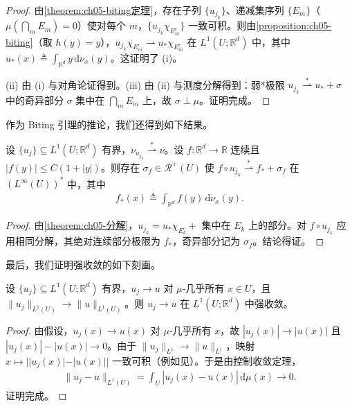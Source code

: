 \documentclass[../../main.tex]{subfiles}%
\begin{document}
\begin{proof}
由\cref{theorem:ch05-biting定理}，存在子列 $\{u_{j_k}\}$、递减集序列 $\{E_m\}$（$\mu(\bigcap_m E_m)=0$）使对每个 $m$，$\{u_{j_k}\chi_{E_m^c}\}$ 一致可积。则由\cref{proposition:ch05-biting}（取 $h(y)=y$），$u_{j_k}\chi_{E_m^c}\rightharpoonup u_*\chi_{E_m^c}$ 在 $L^1(U;\mathbb{R}^d)$ 中，其中 $u_*(x)\triangleq \int_{\mathbb{R}^d}y\,\mathrm{d}\nu_x(y)$。这证明了 (i)。

(ii) 由 (i) 与对角论证得到。(iii) 由 (ii) 与测度分解得到：弱*极限 $u_{j_k}\stackrel{*}{\rightharpoonup}u_*+\sigma$ 中的奇异部分 $\sigma$ 集中在 $\bigcap_m E_m$ 上，故 $\sigma\perp\mu$。证明完成。
\end{proof}

作为 Biting 引理的推论，我们还得到如下结果。

\begin{proposition}\label{proposition:ch05-函数弱星}
设 $\{u_j\}\subseteq L^1(U;\mathbb{R}^d)$ 有界，$\nu_{u_{j_k}}\stackrel{*}{\rightharpoonup}\nu$。设 $f:\mathbb{R}^d\to\mathbb{R}$ 连续且 $|f(y)|\leqslant C(1+|y|)$。则存在 $\sigma_f\in\mathscr{R}^+(U)$ 使 $f\circ u_{j_k}\stackrel{*}{\rightharpoonup}f_*+\sigma_f$ 在 $(L^\infty(U))^*$ 中，其中
\begin{align*}
f_*(x)\triangleq \int_{\mathbb{R}^d}f(y)\,\mathrm{d}\nu_x(y).
\end{align*}
\end{proposition}

\begin{proof}
由\cref{theorem:ch05-分解}，$u_{j_k}=u_*\chi_{E_k^c}+$ 集中在 $E_k$ 上的部分。对 $f\circ u_{j_k}$ 应用相同分解，其绝对连续部分极限为 $f_*$，奇异部分记为 $\sigma_f$。结论得证。
\end{proof}

最后，我们证明强收敛的如下刻画。

\begin{proposition}\label{proposition:ch05-强收敛}
设 $\{u_j\}\subseteq L^1(U;\mathbb{R}^d)$ 有界，$u_j\to u$ 对 $\mu$-几乎所有 $x\in U$，且 $\|u_j\|_{L^1(U)}\to\|u\|_{L^1(U)}$。则 $u_j\to u$ 在 $L^1(U;\mathbb{R}^d)$ 中强收敛。
\end{proposition}

\begin{proof}
由假设，$u_j(x)\to u(x)$ 对 $\mu$-几乎所有 $x$，故 $|u_j(x)|\to|u(x)|$ 且 $|u_j(x)|-|u(x)|\to0$。由于 $\|u_j\|_{L^1}\to\|u\|_{L^1}$，映射 $x\mapsto||u_j(x)|-|u(x)||$ 一致可积（例如见\cite[Theorem 1.29]{ref42}）。于是由控制收敛定理，
\begin{align*}
\|u_j-u\|_{L^1(U)}=\int_U|u_j(x)-u(x)|\,\mathrm{d}\mu(x)\to0.
\end{align*}
证明完成。
\end{proof}
\end{document}
